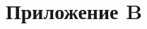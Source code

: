 \documentclass[../main/main.tex]{subfiles}
\begin{document}
    \newpage
    \section{Приложение B}
    \label{sec:listings}
\end{document}
